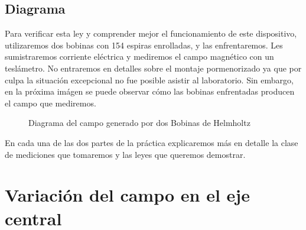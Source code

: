 \documentclass[12pt, a4paper, titlepage]{article}
\begin{document}
  \newpage
  \subsection{Diagrama}

  Para verificar esta ley y comprender mejor el funcionamiento de este dispositivo, utilizaremos dos bobinas con 154 espiras enrolladas, y las enfrentaremos. Les sumistraremos corriente eléctrica y mediremos el campo magnético con un teslámetro. No entraremos en detalles sobre el montaje pormenorizado ya que por culpa la situación excepcional no fue posible asistir al laboratorio. Sin embargo, en la próxima imágen se puede observar cómo las bobinas enfrentadas producen el campo que mediremos.

  \begin{figure}[H]
    \centering
    \caption{Diagrama del campo generado por dos Bobinas de Helmholtz}
  \end{figure}

  En cada una de las dos partes de la práctica explicaremos más en detalle la clase de mediciones que tomaremos y las leyes que queremos demostrar.

  \newpage
  \section{Variación del campo en el eje central}
\end{document}
